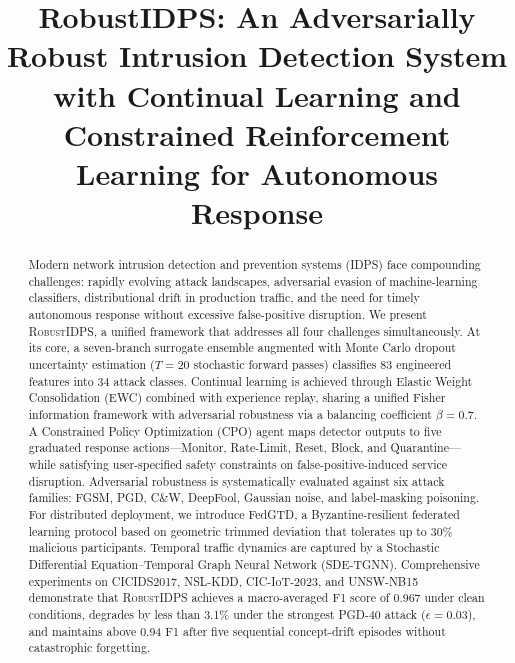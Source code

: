 \documentclass[journal,twoside]{IEEEtran}
\begin{document}
\title{RobustIDPS: An Adversarially Robust Intrusion Detection System with Continual Learning and Constrained Reinforcement Learning for Autonomous Response}

\author{
  \and
}

\maketitle

\begin{abstract}
Modern network intrusion detection and prevention systems (IDPS) face compounding
challenges: rapidly evolving attack landscapes, adversarial evasion of
machine-learning classifiers, distributional drift in production traffic, and the
need for timely autonomous response without excessive false-positive disruption.
We present \textsc{RobustIDPS}, a unified framework that addresses all four
challenges simultaneously. At its core, a seven-branch surrogate ensemble
augmented with Monte Carlo dropout uncertainty estimation ($T{=}20$ stochastic
forward passes) classifies 83 engineered features into 34 attack classes.
Continual learning is achieved through Elastic Weight Consolidation (EWC)
combined with experience replay, sharing a unified Fisher information framework
with adversarial robustness via a balancing coefficient $\beta{=}0.7$.
A Constrained Policy Optimization (CPO) agent maps detector outputs to five
graduated response actions---Monitor, Rate-Limit, Reset, Block, and
Quarantine---while satisfying user-specified safety constraints on
false-positive-induced service disruption. Adversarial robustness is
systematically evaluated against six attack families: FGSM, PGD, C\&W,
DeepFool, Gaussian noise, and label-masking poisoning. For distributed
deployment, we introduce FedGTD, a Byzantine-resilient federated learning
protocol based on geometric trimmed deviation that tolerates up to 30\%
malicious participants. Temporal traffic dynamics are captured by a
Stochastic Differential Equation--Temporal Graph Neural Network (SDE-TGNN).
Comprehensive experiments on CICIDS2017, NSL-KDD, CIC-IoT-2023, and
UNSW-NB15 demonstrate that \textsc{RobustIDPS} achieves a macro-averaged
F1 score of 0.967 under clean conditions, degrades by less than 3.1\% under
the strongest PGD-40 attack ($\epsilon{=}0.03$), and maintains above 0.94 F1
after five sequential concept-drift episodes without catastrophic forgetting.
\end{abstract}
\end{document}
